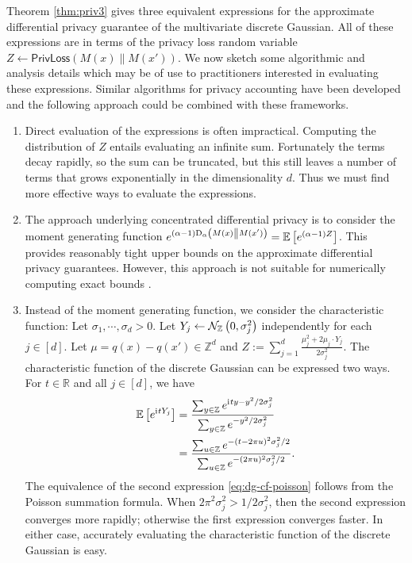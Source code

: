 \documentclass{jpcfinal} %
\newcommand{\ii}{\mathrm{i}\mkern1mu}
\newcommand{\dgausss}[2]{{\discN\left(#1,#2\right)}}
\newcommand{\dgauss}[1]{\dgausss{0}{#1}}
\newcommand{\ex}[2]{{\ifx&#1& \mathbb{E} \else
\underset{#1}{\mathbb{E}} \fi \left[#2\right]}}
\newcommand{\dr}[3]{\mathrm{D}_{#1}\left(#2\middle\|#3\right)}
\newcommand{\privloss}[2]{\mathsf{PrivLoss}\left(#1\middle\|#2\right)}
\newcommand{\Z}{\mathbb{Z}}
\newcommand{\R}{\mathbb{R}}
\begin{document}
Theorem \ref{thm:priv3} gives three equivalent expressions for the approximate differential privacy guarantee of the multivariate discrete Gaussian. All of these expressions are in terms of the privacy loss random variable $Z \gets \privloss{M(x)}{M(x')}$. We now sketch some algorithmic and analysis details which may be of use to practitioners interested in evaluating these expressions. Similar algorithms for privacy accounting have been developed \cite{KoskelaJPH20,GoogleComposition,ZhuDW21} and the following approach could be combined with these frameworks.
\begin{enumerate}
    \item Direct evaluation of the expressions is often impractical. Computing the distribution of $Z$ entails evaluating an infinite sum. Fortunately the terms decay rapidly, so the sum can be truncated, but this still leaves a number of terms that grows exponentially in the dimensionality $d$. Thus we must find more effective ways to evaluate the expressions.
    \item The approach underlying concentrated differential privacy is to consider the moment generating function $e^{(\alpha-1)\dr{\alpha}{M(x)}{M(x')}} = \ex{}{e^{(\alpha-1)Z}}$. This provides reasonably tight upper bounds on the approximate differential privacy guarantees. However, this approach is not suitable for numerically computing exact bounds \citep{McCullagh94}.
    \item Instead of the moment generating function, we consider the characteristic function: Let $\sigma_1, \cdots, \sigma_d >0$. Let $Y_j \gets \dgauss{\sigma_j^2}$ independently for each $j \in [d]$.
    Let $\mu = q(x)-q(x') \in \Z^d$ and $
    Z := \sum_{j=1}^d \frac{\mu_j^2 + 2 \mu_j \cdot Y_j}{2\sigma_j^2}.
    $
    The characteristic function of the discrete Gaussian can be expressed two ways. For $t \in \R$ and all $j \in [d]$, we have
    \begin{align}
        \ex{}{e^{\ii{}tY_j}} &= \frac{\sum_{y \in \Z} e^{\ii{}ty-y^2/2\sigma_j^2}}{\sum_{y \in \Z} e^{-y^2/2\sigma_j^2}}\label{eq:dg-cf}\\
        &= \frac{\sum_{u \in \Z} e^{-(t-2\pi u)^2\sigma_j^2/2}}{\sum_{u \in \Z} e^{-(2\pi u)^2\sigma_j^2/2}}.\label{eq:dg-cf-poisson}
    \end{align}
    The equivalence of the second expression \eqref{eq:dg-cf-poisson} follows from the Poisson summation formula. When $2\pi^2\sigma_j^2 > 1/2\sigma_j^2$, then the second expression converges more rapidly; otherwise the first expression converges faster. In either case, accurately evaluating the characteristic function of the discrete Gaussian is easy.
    

\end{enumerate}
\end{document}
